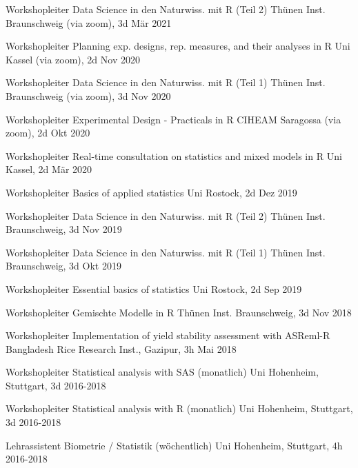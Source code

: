\documentclass[11pt, a4paper]{awesome-cv}
\begin{document}
\begin{cvhonors}

  \cvhonor
    {Workshopleiter  }
    {Data Science in den Naturwiss. mit R (Teil 2)}
    {Thünen Inst. Braunschweig (via zoom), 3d}
    {Mär 2021  }  

  \cvhonor
    {Workshopleiter  }
    {Planning exp. designs, rep. measures, and their analyses in R}
    {Uni Kassel (via zoom), 2d}
    {Nov 2020  }
    
  \cvhonor
    {Workshopleiter  }
    {Data Science in den Naturwiss. mit R (Teil 1)}
    {Thünen Inst. Braunschweig (via zoom), 3d}
    {Nov 2020  } 
    
  \cvhonor
    {Workshopleiter  }
    {Experimental Design - Practicals in R}
    {CIHEAM Saragossa (via zoom), 2d}
    {Okt 2020  }

  \cvhonor
    {Workshopleiter  }
    {Real-time consultation on statistics and mixed models in R}
    {Uni Kassel, 2d}
    {Mär 2020  }
    
  \cvhonor
    {Workshopleiter  }
    {Basics of applied statistics}
    {Uni Rostock, 2d}
    {Dez 2019  }
  
  \cvhonor
    {Workshopleiter  }
    {Data Science in den Naturwiss. mit R (Teil 2)}
    {Thünen Inst. Braunschweig, 3d}
    {Nov 2019  }    

  \cvhonor
    {Workshopleiter  }
    {Data Science in den Naturwiss. mit R (Teil 1)}
    {Thünen Inst. Braunschweig, 3d}
    {Okt 2019  }      

  \cvhonor
    {Workshopleiter  }
    {Essential basics of statistics}
    {Uni Rostock, 2d}
    {Sep 2019  }  

  \cvhonor
    {Workshopleiter  }
    {Gemischte Modelle in R}
    {Thünen Inst. Braunschweig, 3d}
    {Nov 2018  }  
    
  \cvhonor
    {Workshopleiter  }
    {Implementation of yield stability assessment with ASReml-R}
    {Bangladesh Rice Research Inst., Gazipur, 3h}
    {Mai 2018  }
    
  \cvhonor
    {Workshopleiter  }
    {Statistical analysis with SAS (monatlich)}
    {Uni Hohenheim, Stuttgart, 3d}
    {2016-2018  }
    
  \cvhonor
    {Workshopleiter  }
    {Statistical analysis with R (monatlich)}
    {Uni Hohenheim, Stuttgart, 3d}
    {2016-2018  }
    
  \cvhonor
    {Lehrassistent  }
    {Biometrie / Statistik (wöchentlich)}
    {Uni Hohenheim, Stuttgart, 4h}
    {2016-2018  }
        
\end{cvhonors}
\end{document}
